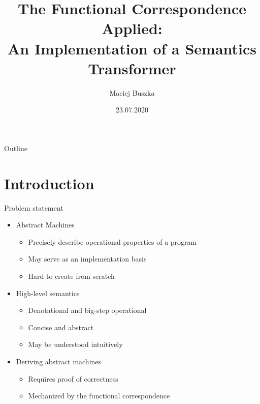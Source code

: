 \documentclass{beamer}
\title[The Functional Correspondence Applied]{The Functional Correspondence Applied:\\ An Implementation of a Semantics Transformer}
\author[Maciej Buszka]{Maciej Buszka}
\institute[II UWr]{Instytut Informatyki UWr\\{\vspace{\baselineskip}Supervised by: dr. hab. Dariusz Biernacki}}
\date{23.07.2020}
\begin{document}
\begin{frame}
  \titlepage
\end{frame}

\begin{frame}{Outline}
  \tableofcontents
\end{frame}

\section{Introduction}
\begin{frame}{Problem statement}
  \begin{itemize}
    \item Abstract Machines
    \begin{itemize}
      \item Precisely describe operational properties of a program
      \item May serve as an implementation basis
      \item Hard to create from scratch
    \end{itemize}
    \pause
    \item High-level semantics
    \begin{itemize}
      \item Denotational and big-step operational
      \item Concise and abstract
      \item May be understood intuitively
    \end{itemize}
    \pause
    \item Deriving abstract machines
    \begin{itemize}
      \item Requires proof of correctness
      \item Mechanized by the functional correspondence
    \end{itemize}
  \end{itemize}
\end{frame}
\end{document}
